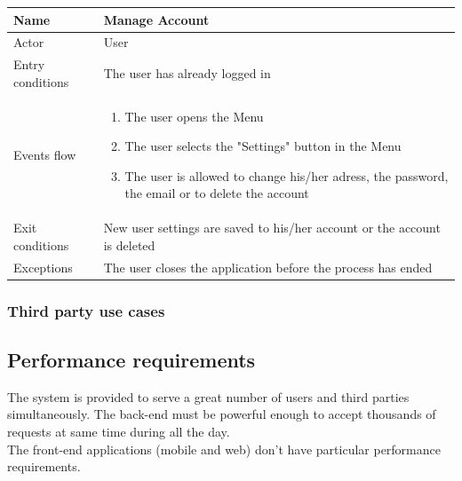 \documentclass{article}
\begin{document}
\begin{table}[H]
    \begin{tabular}{|l|l|}
    \hline
    Name & \begin{minipage}[t]{0.7\textwidth} Manage Account \end{minipage} \\ \hline  
     Actor & \begin{minipage}[t]{0.7\textwidth} User \end{minipage} \\ \hline 
     Entry conditions & \begin{minipage}[t]{0.7\textwidth} The user has already logged in \end{minipage} \\
     \hline 
     Events flow & \begin{minipage}[t]{0.7\textwidth} 
    \begin{enumerate}
        \item The user opens the Menu
        \item The user selects the "Settings" button in the Menu
        \item The user is allowed to change his/her adress, the password, the
        email or to delete the account
    \end{enumerate}    
    \end{minipage} \\ \hline
     Exit conditions & \begin{minipage}[t]{0.7\textwidth} New user settings are
     saved to his/her account or the account is deleted \end{minipage} \\
     \hline
     Exceptions & \begin{minipage}[t]{0.7\textwidth} The user closes the
     application before the process has ended \end{minipage} \\ \hline
    \end{tabular}
\end{table}

\subsubsection{Third party use cases}
\subsection{Performance requirements}
The system is provided to serve a great number of users and third parties
simultaneously. The back-end must be powerful enough to accept thousands of
requests at same time during all the day.\\
The front-end applications (mobile and web) don't have particular performance
requirements.
\end{document}
